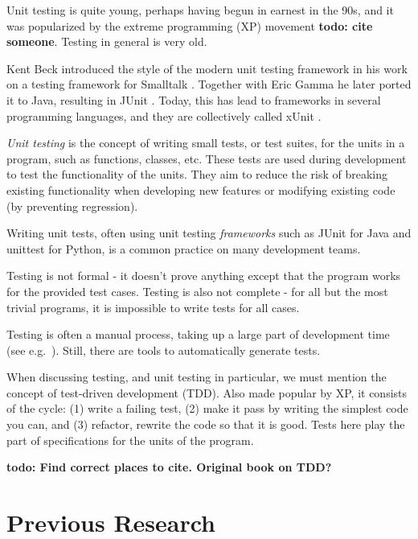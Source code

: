 \documentclass[a4paper,11pt]{kth-mag}
\newcommand{\todo}[1]{\textbf{todo: #1}}
\begin{document}
Unit testing is quite young, perhaps having begun in earnest in the 90s, and it
was popularized by the extreme programming (XP) movement \todo{cite someone}.
Testing in general is very old.

Kent Beck introduced the style of the modern unit testing framework in his work
on a testing framework  for Smalltalk \cite{becksmalltalktesting}.  Together
with Eric Gamma he later ported it to Java, resulting in JUnit \cite{junit}.
Today, this has lead to frameworks in several programming languages, and they
are collectively called xUnit \cite{fowlerxunit}.

\textit{Unit testing} is the concept of writing small tests, or test suites,
for the units in a program, such as functions, classes, etc. These tests are
used during development to test the functionality of the units. They aim to
reduce the risk of breaking existing functionality when developing new features
or modifying existing code (by preventing regression).

Writing unit tests, often using unit testing \textit{frameworks} such as JUnit
\cite{junit} for Java and unittest \cite{python-unittest} for Python, is a
common practice on many development teams.

Testing is not formal - it doesn't prove anything except that the program works
for the provided test cases. Testing is also not complete - for all but the
most trivial programs, it is impossible to write tests for all cases.

Testing is often a manual process, taking up a large part of development time
(see e.g.\ \cite{brooks75mythicalmanmonth}). Still, there are tools to automatically
generate tests.

When discussing testing, and unit testing in particular, we must mention the
concept of test-driven development (TDD). Also made popular by XP, it consists
of the cycle: (1) write a failing test, (2) make it pass by writing the
simplest code you can, and (3) refactor, rewrite the code so that it is good.
Tests here play the part of specifications for the units of the program.

\todo{Find correct places to cite. Original book on TDD?}





\pagestyle{newchap}
\chapter{Previous Research} \label{chapter-previous-research}
\end{document}
